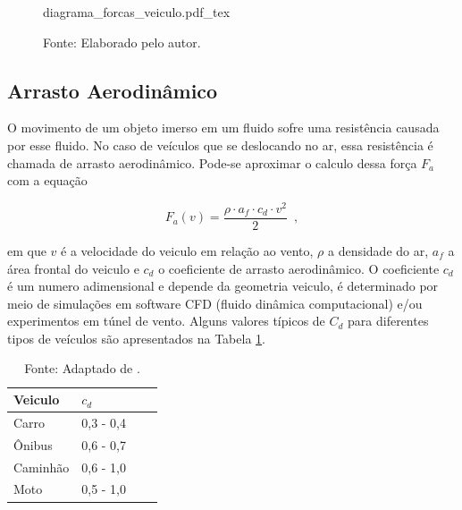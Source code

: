\begin{figure}[H]
	\centering
	\caption{Diagrama de forças de um veículo em movimento}
	\label{fig:diag_forcas_veiculo}
	\begin{normalsize}
		{diagrama_forcas_veiculo.pdf_tex}
	\end{normalsize}
	\caption*{\footnotesize Fonte: Elaborado pelo autor.}
\end{figure}

\subsection{Arrasto Aerodinâmico}
\label{subsec:arrasto_aerodinamico}

O movimento de um objeto imerso em um fluido sofre uma resistência causada por esse fluido. No
caso de veículos que se deslocando no ar, essa
resistência é chamada de arrasto aerodinâmico.
Pode-se aproximar o calculo dessa força $F_{a}$ com a equação

\begin{equation}
	\label{eq:Fa}
	F_a(v) = \frac{\rho \cdot a_f \cdot c_d \cdot v^2}{2}
	\enspace,
\end{equation}

em que $v$ é a velocidade do veiculo em relação ao vento, $\rho$ a densidade do ar, $a_{f}$ a área frontal do
veiculo e $c_{d}$ o coeficiente de arrasto aerodinâmico.
O coeficiente $c_{d}$ é um numero adimensional e depende da geometria veiculo, é determinado por meio de simulações em software CFD (fluido dinâmica
computacional) e/ou experimentos em túnel de vento\cite{book:guzzella2012vehicle}. Alguns valores típicos de $C_{d}$ para diferentes tipos de
veículos são apresentados na Tabela \ref{tab:ComparacaoCD}.

\begin{table}[H]
	\centering
	\caption{Comparação do $c_{d}$ de diferentes tipos veículos}
	\begin{tabular}{llll}
		\toprule
		Veiculo  & $c_{d}$   &  & \\
		\hline
		Carro    & 0,3 - 0,4 &  & \\
		Ônibus   & 0,6 - 0,7 &  & \\
		Caminhão & 0,6 - 1,0 &  & \\
		Moto     & 0,5 - 1,0 &  & \\
		\bottomrule
	\end{tabular}
	\caption*{\footnotesize Fonte: Adaptado de \citeauthor{book:GroundVehicleDynamics}.}
	\label{tab:ComparacaoCD}
\end{table}


